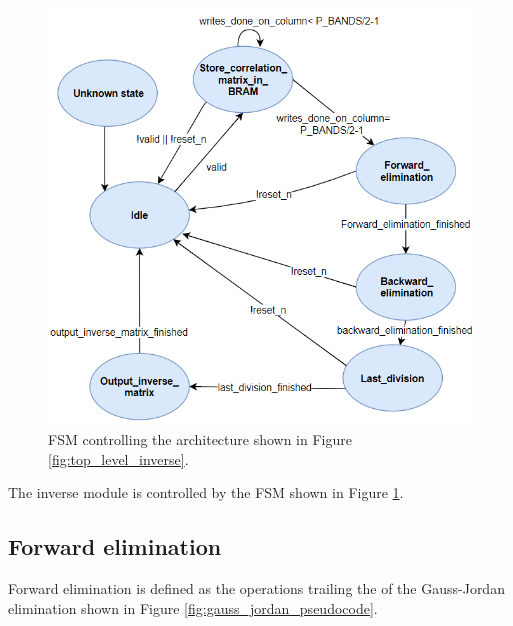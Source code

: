 \begin{figure}[H]
\centering
   \includegraphics[scale=0.5]{images/inverse_hw/fsm_inverse_matrix.PNG}
  \caption{FSM controlling the architecture shown in Figure \ref{fig:top_level_inverse}.  } 
  \label{fig:fsm_inverse_matrix}
\end{figure}

The inverse module is controlled by the FSM shown in Figure \ref{fig:fsm_inverse_matrix}. 

\subsection{Forward elimination}
Forward elimination is defined as the operations trailing the   of the Gauss-Jordan elimination shown in Figure \ref{fig:gauss_jordan_pseudocode}.


